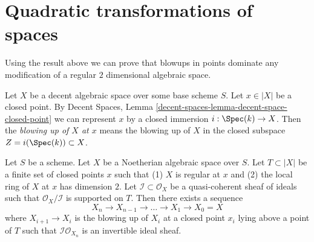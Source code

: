 \section{Quadratic transformations of spaces}
\label{section-quadratic-spaces}

\noindent
Using the result above we can prove that blowups in points dominate
any modification of a regular $2$ dimensional algebraic space.

\medskip\noindent
Let $X$ be a decent algebraic space over some base scheme $S$.
Let $x \in |X|$ be a closed point. By
Decent Spaces, Lemma \ref{decent-spaces-lemma-decent-space-closed-point}
we can represent $x$ by a closed immersion $i : \Spec(k) \to X$.
Then the {\it blowing up of $X$ at $x$} means the blowing up of $X$
in the closed subspace $Z = i(\Spec(k)) \subset X$.

\begin{lemma}
\label{lemma-make-ideal-principal}
Let $S$ be a scheme. Let $X$ be a Noetherian algebraic space over $S$.
Let $T \subset |X|$ be a finite set of closed points $x$ such that
(1) $X$ is regular at $x$ and (2) the local ring of $X$ at $x$ has
dimension $2$. Let $\mathcal{I} \subset \mathcal{O}_X$ be a quasi-coherent
sheaf of ideals such that $\mathcal{O}_X/\mathcal{I}$ is supported on $T$.
Then there exists a sequence
$$
X_n \to X_{n - 1} \to \ldots \to X_1 \to X_0 = X
$$
where $X_{i + 1} \to X_i$ is the blowing up of $X_i$ at a closed
point $x_i$ lying above a point of $T$ such that
$\mathcal{I}\mathcal{O}_{X_n}$ is an invertible ideal sheaf.
\end{lemma}

